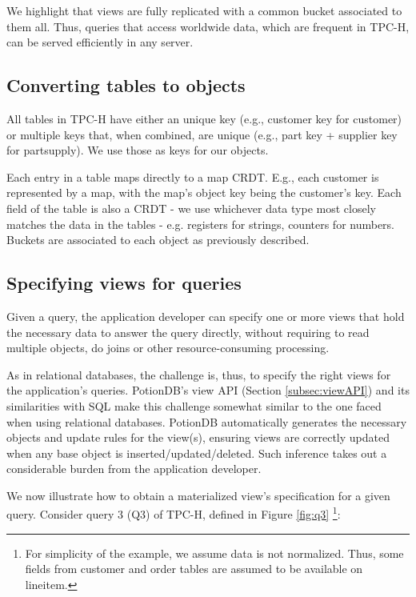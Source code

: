 \documentclass{vldb}
\begin{document}
We highlight that views are fully replicated with a common bucket associated to them all.
Thus, queries that access worldwide data, which are frequent in TPC-H, can  be served efficiently in any server.

\subsection{Converting tables to objects}
\label{subsec:tables_to_objects}

All tables in TPC-H have either an unique key (e.g., customer key for customer) or multiple keys that, when combined, are unique (e.g., part key + supplier key for partsupply).
We use those as keys for our objects.	%

Each entry in a table maps directly to a map CRDT.
E.g., each customer is represented by a map, with the map's object key being the customer's key.
Each field of the table is also a CRDT - we use whichever data type most closely matches the data in the tables - e.g. registers for strings, counters for numbers.
Buckets are associated to each object as previously described.

\subsection{Specifying views for queries}
\label{subsec:views_for_queries}

Given a query, the application developer can specify one or more views that hold the necessary data to answer the query directly, without requiring to read multiple objects, do joins or other resource-consuming processing.

As in relational databases, the challenge is, thus, to specify the right views for the application's queries.
PotionDB's view API (Section \ref{subsec:viewAPI}) and its similarities with SQL make this challenge somewhat similar to the one faced when using relational databases.
PotionDB automatically generates the necessary objects and update rules for the view(s), ensuring views are correctly updated when any base object is inserted/updated/deleted.
Such inference takes out a considerable burden from the application developer.

We now illustrate how to obtain a materialized view’s specification for a given query. 
Consider query 3 (Q3) of TPC-H, defined in Figure \ref{fig:q3}
\footnote{For simplicity of the example, we assume data is not normalized. Thus, some fields from customer and order tables are assumed to be available on lineitem.}:
\end{document}
